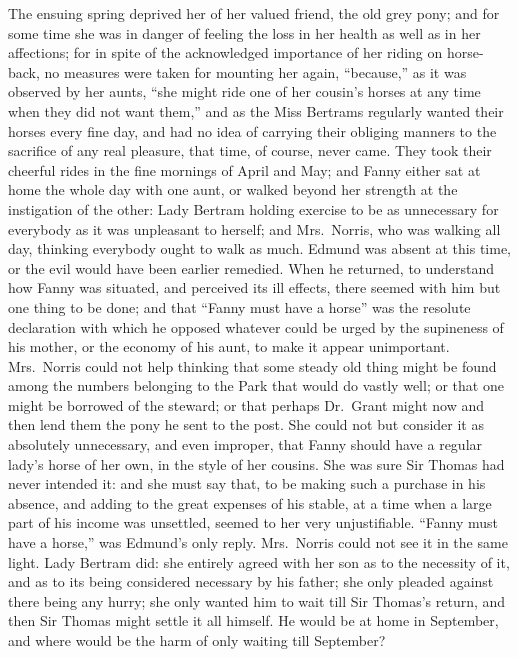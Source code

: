 \documentclass{article}
\begin{document}
The ensuing spring deprived her of her valued friend,
the old grey pony; and for some time she was in danger of
feeling the loss in her health as well as in her affections;
for in spite of the acknowledged importance of her riding
on horse-back, no measures were taken for mounting
her again, ``because,'' as it was observed by her aunts,
``she might ride one of her cousin's horses at any time
when they did not want them,'' and as the Miss Bertrams
regularly wanted their horses every fine day, and had no
idea of carrying their obliging manners to the sacrifice
of any real pleasure, that time, of course, never came.
They took their cheerful rides in the fine mornings
of April and May; and Fanny either sat at home the whole
day with one aunt, or walked beyond her strength at the
instigation of the other:  Lady Bertram holding exercise
to be as unnecessary for everybody as it was unpleasant
to herself; and Mrs.\ Norris, who was walking all day,
thinking everybody ought to walk as much.  Edmund was absent
at this time, or the evil would have been earlier remedied.
When he returned, to understand how Fanny was situated,
and perceived its ill effects, there seemed with him but
one thing to be done; and that ``Fanny must have a horse''
was the resolute declaration with which he opposed
whatever could be urged by the supineness of his mother,
or the economy of his aunt, to make it appear unimportant.
Mrs.\ Norris could not help thinking that some steady
old thing might be found among the numbers belonging
to the Park that would do vastly well; or that one might
be borrowed of the steward; or that perhaps Dr.\ Grant
might now and then lend them the pony he sent to the post.
She could not but consider it as absolutely unnecessary,
and even improper, that Fanny should have a regular
lady's horse of her own, in the style of her cousins.
She was sure Sir Thomas had never intended it:  and she
must say that, to be making such a purchase in his absence,
and adding to the great expenses of his stable,
at a time when a large part of his income was unsettled,
seemed to her very unjustifiable.  ``Fanny must have
a horse,'' was Edmund's only reply.  Mrs.\ Norris could
not see it in the same light.  Lady Bertram did:
she entirely agreed with her son as to the necessity of it,
and as to its being considered necessary by his father;
she only pleaded against there being any hurry; she only
wanted him to wait till Sir Thomas's return, and then Sir
Thomas might settle it all himself.  He would be at home
in September, and where would be the harm of only waiting
till September?
\end{document}
